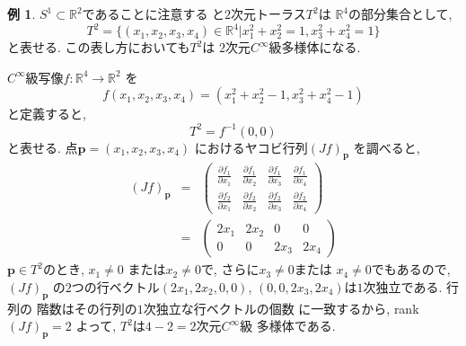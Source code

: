 \documentclass[a4j,12pt]{jarticle}
\theoremstyle{definition}
\newtheorem{example}[theorem]{例}
\begin{document}
\begin{example}
    $S^1 \subset \mathbb{R}^2$であることに注意する
    と$2$次元トーラス$T^2$は
    $\mathbb{R}^4$の部分集合として, 
    $$T^2=\{(x_1,x_2,x_3,x_4)\in \mathbb{R}^4|
    x_1^2+x_2^2=1, x_3^2+x_4^2=1\}$$
    と表せる. この表し方においても$T^2$は
    $2$次元$C^\infty$級多様体になる. 

    $C^\infty$級写像$f:\mathbb{R}^4\to \mathbb{R}^2$
    を
    $$f(x_1,x_2,x_3,x_4)=(x_1^2+x_2^2-1,
    x_3^2+x_4^2-1)$$と定義すると, 
    $$T^2=f^{-1}(0,0)$$
    と表せる. 点$\boldsymbol{p}=(x_1,x_2,x_3,x_4)$
    におけるヤコビ行列$(Jf)_{\boldsymbol{p}}$
    を調べると, 
    \begin{eqnarray*}
        (Jf)_{\boldsymbol{p}}&=&
        \left(\begin{array}{cccc}
            \frac{\partial f_1}{\partial x_1}&
            \frac{\partial f_1}{\partial x_2}&
            \frac{\partial f_1}{\partial x_3}&
            \frac{\partial f_1}{\partial x_4}\\
            \frac{\partial f_2}{\partial x_1}&
            \frac{\partial f_2}{\partial x_2}&
            \frac{\partial f_2}{\partial x_3}&
            \frac{\partial f_2}{\partial x_4}
        \end{array}\right)\\
        &=&
        \left(\begin{array}{cccc}
            2x_1&2x_2&0&0\\
            0&0&2x_3&2x_4
        \end{array}\right)
    \end{eqnarray*}
    $\boldsymbol{p}\in T^2$のとき, $x_1\neq 0$
    または$x_2\neq 0$で, さらに$x_3\neq 0$または
    $x_4\neq 0$でもあるので, $(Jf)_{\boldsymbol{p}}$
    の$2$つの行ベクトル$(2x_1,2x_2,0,0)$, 
    $(0,0,2x_3,2x_4)$は$1$次独立である. 行列の
    階数はその行列の$1$次独立な行ベクトルの個数
    に一致するから, rank$(Jf)_{\boldsymbol{p}}=2$
    よって, $T^2$は$4-2=2$次元$C^\infty$級
    多様体である. 
\end{example}
\end{document}
